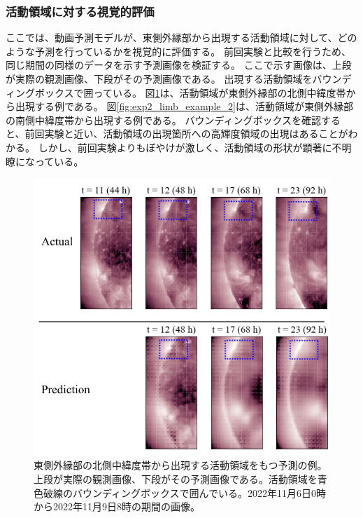       \subsubsection{活動領域に対する視覚的評価}
        ここでは、動画予測モデルが、東側外縁部から出現する活動領域に対して、どのような予測を行っているかを視覚的に評価する。
        前回実験と比較を行うため、同じ期間の同様のデータを示す予測画像を検証する。
        ここで示す画像は、上段が実際の観測画像、下段がその予測画像である。
        出現する活動領域をバウンディングボックスで囲っている。
        図\ref{fig:exp2_limb_example_1}は、活動領域が東側外縁部の北側中緯度帯から出現する例である。
        図\ref{fig:exp2_limb_example_2}は、活動領域が東側外縁部の南側中緯度帯から出現する例である。
        バウンディングボックスを確認すると、前回実験と近い、活動領域の出現箇所への高輝度領域の出現はあることがわかる。
        しかし、前回実験よりもぼやけが激しく、活動領域の形状が顕著に不明瞭になっている。
        \begin{figure}[htbp]
          \centering
          \includegraphics[width=\textwidth]{figures/exp2/limb_sample_3_caption.jpg}
          \caption{東側外縁部の北側中緯度帯から出現する活動領域をもつ予測の例。上段が実際の観測画像、下段がその予測画像である。活動領域を青色破線のバウンディングボックスで囲んでいる。2022年11月6日0時から2022年11月9日8時の期間の画像。}
          \label{fig:exp2_limb_example_1}
        \end{figure}
